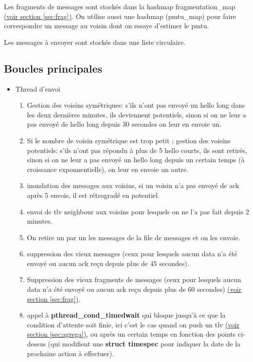 \documentclass[a4paper,10pt]{article} %
\begin{document}
Les fragments de messages sont stockés dans la hashmap \textrm{fragmentation\_map} \hyperref[sec:frag]{(voir section \ref{sec:frag})}. On utilise aussi une hashmap (\textrm{pmtu\_map}) pour faire correspondre un message au voisin dont on essaye d'estimer le pmtu.

Les messages à envoyer sont stockés dans une liste circulaire.

\subsection{Boucles principales}
\begin{itemize}
    \item Thread d'envoi
\begin{enumerate}
\item Gestion des voisins symétriques: s'ils n'ont pas envoyé un hello long dans les deux dernières minutes, ils deviennent potentiels, sinon si on ne leur a pas envoyé de hello long depuis 30 secondes on leur en envoie un.
\item Si le nombre de voisin symétrique est trop petit ; gestion des voisins potentiels: s'ils n'ont pas répondu à plus de 5 hello courts, ils sont retirés, sinon si on ne leur a pas envoyé un hello long depuis un certain temps (à croissance exponnentielle), on leur en envoie un autre.
\item inondation des messages aux voisins, si un voisin n'a pas envoyé de ack après 5 envois, il est rétrogradé en potentiel.
\item envoi de tlv neighbour aux voisins pour lesquels on ne l'a pas fait depuis 2 minutes.
\item On retire un par un les messages de la file de messages et on les envoie.
\item suppression des vieux messages (ceux pour lesquels aucun data n'a été envoyé ou aucun ack reçu depuis plus de 45 secondes).
\item Suppression des vieux fragments de messages (ceux pour lesquels aucun data n'a été envoyé ou aucun ack reçu depuis plus de 60 secondes) \hyperref[sec:frag]{(voir section \ref{sec:frag})}.
\item appel à \textbf{pthread\_cond\_timedwait} qui bloque jusqu'à ce que la condition d'attente soit finie, ici c'est le cas quand on push un tlv \hyperref[sec:frag]{(voir section \ref{sec:agrega})}, ou après un certain temps en fonction des points ci-dessus (qui modifient une \textbf{struct timespec} pour indiquer la date de la prochaine action à effectuer).


\end{enumerate}
\end{itemize}
\end{document}
